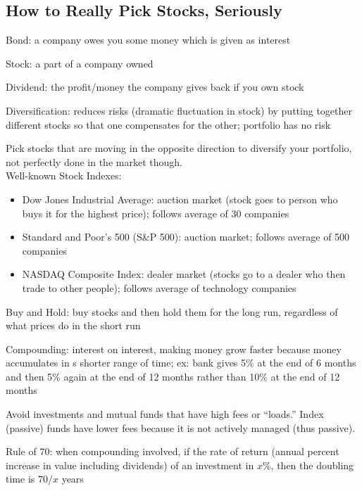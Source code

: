 \documentclass[12pt]{article}
\begin{document}
\subsection{How to Really Pick Stocks, Seriously}

\begin{definition} Bond: a company owes you some money which is given as interest \end{definition} 
\begin{definition} Stock: a part of a company owned  \end{definition} 
\begin{definition} Dividend: the profit/money the company gives back if you own stock \end{definition} 
\begin{definition} Diversification: reduces risks (dramatic fluctuation in stock) by putting together different stocks so that one compensates for the other; portfolio has no risk \end{definition}
Pick stocks that are moving in the opposite direction to diversify your portfolio, not perfectly done in the market though.  \\
Well-known Stock Indexes: \begin{itemize} \item Dow Jones Industrial Average: auction market (stock goes to person who buys it for the highest price); follows average of 30 companies  \item Standard and Poor's 500 (S\&P 500): auction market; follows average of 500 companies \item NASDAQ Composite Index: dealer market (stocks go to a dealer who then trade to other people); follows average of technology companies \end{itemize} 
\begin{definition} Buy and Hold: buy stocks and then hold them for the long run, regardless of what prices do in the short run \end{definition}
\begin{definition} Compounding: interest on interest, making money grow faster because money accumulates in s shorter range of time; ex: bank gives 5\% at the end of 6 months and then 5\% again at the end of 12 months rather than 10\% at the end of 12 months \end{definition} 
Avoid investments and mutual funds that have high fees or ``loads.'' Index (passive) funds have lower fees because it is not actively managed (thus passive). 
\begin{definition} Rule of 70: when compounding involved, if the rate of return (annual percent increase in value including dividends) of an investment in $x\%$, then the doubling time is $70/x$ years \end{definition} 
\end{document}
